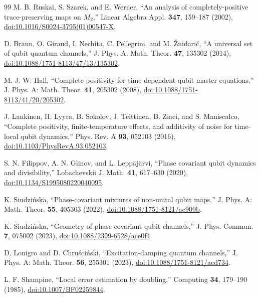 \begin{thebibliography}{99}
M. B. Ruskai, S. Szarek, and E. Werner, ``An analysis of completely-positive trace-preserving maps on $M_2$,'' Linear Algebra Appl. \textbf{347}, 159--187 (2002), \href{https://doi.org/10.1016/S0024-3795(01)00547-X}{doi:10.1016/S0024-3795(01)00547-X}.

D. Braun, O. Giraud, I. Nechita, C. Pellegrini, and M. \v{Z}nidari\v{c}, ``A universal set of qubit quantum channels,'' J. Phys. A: Math. Theor. \textbf{47}, 135302 (2014), \href{https://doi.org/10.1088/1751-8113/47/13/135302}{doi:10.1088/1751-8113/47/13/135302}.

M. J. W. Hall, ``Complete positivity for time-dependent qubit master equations,'' J. Phys. A: Math. Theor. \textbf{41}, 205302 (2008), \href{https://doi.org/10.1088/1751-8113/41/20/205302}{doi:10.1088/1751-8113/41/20/205302}.

J. Lankinen, H. Lyyra, B. Sokolov, J. Teittinen, B. Ziaei, and S. Maniscalco, ``Complete positivity, finite-temperature effects, and additivity of noise for time-local qubit dynamics,'' Phys. Rev. A \textbf{93}, 052103 (2016), \href{https://doi.org/10.1103/PhysRevA.93.052103}{doi:10.1103/PhysRevA.93.052103}.

S. N. Filippov, A. N. Glinov, and L. Lepp\"aj\"arvi, ``Phase covariant qubit dynamics and divisibility,'' Lobachevskii J. Math. \textbf{41}, 617--630 (2020), \href{https://doi.org/10.1134/S1995080220040095}{doi:10.1134/S1995080220040095}.

K. Siudzi\'nska, ``Phase-covariant mixtures of non-unital qubit maps,'' J. Phys. A: Math. Theor. \textbf{55}, 405303 (2022), \href{https://doi.org/10.1088/1751-8121/ac909b}{doi:10.1088/1751-8121/ac909b}.

K. Siudzi\'nska, ``Geometry of phase-covariant qubit channels,'' J. Phys. Commun. \textbf{7}, 075002 (2023), \href{https://doi.org/10.1088/2399-6528/ace0f4}{doi:10.1088/2399-6528/ace0f4}.

D. Lonigro and D. Chru\'sci\'nski, ``Excitation-damping quantum channels,'' J. Phys. A: Math. Theor. \textbf{56}, 255301 (2023), \href{https://doi.org/10.1088/1751-8121/acd734}{doi:10.1088/1751-8121/acd734}.

L. F. Shampine, ``Local error estimation by doubling,'' Computing \textbf{34}, 179--190 (1985), \href{https://doi.org/10.1007/BF02259844}{doi:10.1007/BF02259844}.


\end{thebibliography}
